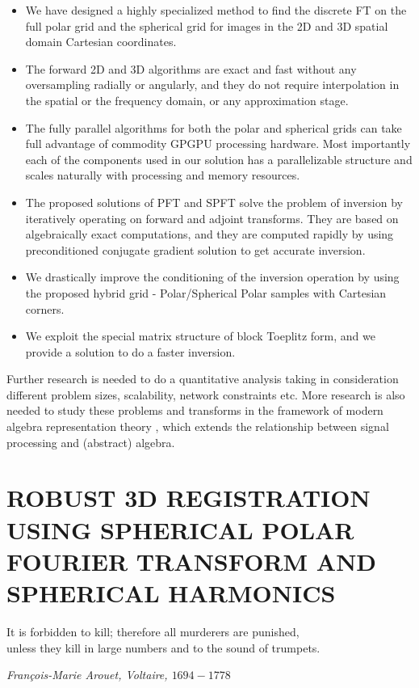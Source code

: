 \documentclass{UCF_ETD}
\begin{document}
 \begin{itemize}
 \item We have designed a highly specialized method to find the discrete FT on the full polar grid and the spherical grid for images in the 2D and 3D spatial domain Cartesian coordinates.
 \item The forward 2D and 3D algorithms are exact and fast without any oversampling radially or angularly, and they do not require interpolation in the spatial or the frequency domain, or any approximation stage.
 \item The fully parallel algorithms for both the polar and spherical grids can take full advantage of commodity GPGPU processing hardware. Most importantly each of the components used in our solution has a parallelizable structure and scales naturally with processing and memory resources.
 \item The proposed solutions of PFT and SPFT solve the problem of inversion by iteratively operating on forward and adjoint transforms. They are based on algebraically exact computations, and they are computed rapidly by using preconditioned conjugate gradient solution to get accurate inversion.
 \item We drastically improve the conditioning of the inversion operation by using the proposed hybrid grid - Polar/Spherical Polar samples with Cartesian corners.
 \item We exploit the special matrix structure of block Toeplitz form, and we provide a solution to do a faster inversion.
 \end{itemize}
 
 Further research is needed to do a quantitative analysis taking in consideration different problem sizes, scalability, network constraints etc.  More research is also needed to study these problems and transforms in the framework of modern algebra representation theory \cite{Markus2008}, which extends the relationship between signal processing and (abstract) algebra.
 

\chapter{ROBUST 3D REGISTRATION USING SPHERICAL POLAR FOURIER TRANSFORM AND SPHERICAL HARMONICS} \label{RobustRegistration}

\epigraph{It is forbidden to kill; therefore all murderers are punished, \\
unless they kill in large numbers and to the sound of trumpets.}{\itshape François-Marie Arouet, Voltaire, $1694 - 1778$}
\end{document}
